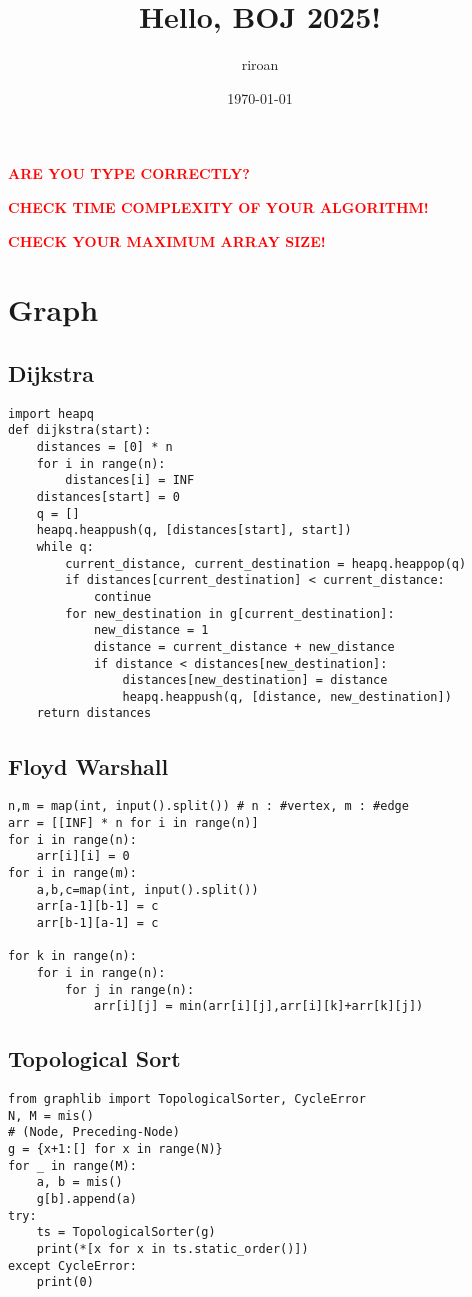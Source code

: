 \documentclass[landscape, 8pt, a4paper, oneside, twocolumn]{extarticle}
\title{Hello, BOJ 2025!}
\author{riroan}
\date{\today}
\begin{document}
	{

		\maketitle


		\tableofcontents
	}
	\thispagestyle{fancy}
	\pagebreak
\textcolor{red}{\textbf{ARE YOU TYPE CORRECTLY?}}

\textcolor{red}{\textbf{CHECK TIME COMPLEXITY OF YOUR ALGORITHM!}}

\textcolor{red}{\textbf{CHECK YOUR MAXIMUM ARRAY SIZE!}}
\section{Graph}
\subsection{Dijkstra}
\begin{verbatim}
import heapq
def dijkstra(start):
    distances = [0] * n
    for i in range(n):
        distances[i] = INF
    distances[start] = 0
    q = []
    heapq.heappush(q, [distances[start], start])
    while q:
        current_distance, current_destination = heapq.heappop(q)
        if distances[current_destination] < current_distance:
            continue
        for new_destination in g[current_destination]:
            new_distance = 1
            distance = current_distance + new_distance
            if distance < distances[new_destination]:
                distances[new_destination] = distance
                heapq.heappush(q, [distance, new_destination])
    return distances
	\end{verbatim}
	\subsection{Floyd Warshall}
\begin{verbatim}
n,m = map(int, input().split()) # n : #vertex, m : #edge
arr = [[INF] * n for i in range(n)]
for i in range(n):
    arr[i][i] = 0
for i in range(m):
    a,b,c=map(int, input().split())
    arr[a-1][b-1] = c
    arr[b-1][a-1] = c

for k in range(n):
    for i in range(n):
        for j in range(n):
            arr[i][j] = min(arr[i][j],arr[i][k]+arr[k][j])
\end{verbatim}
\subsection{Topological Sort}
\begin{verbatim}
from graphlib import TopologicalSorter, CycleError
N, M = mis()
# (Node, Preceding-Node)
g = {x+1:[] for x in range(N)}
for _ in range(M):
    a, b = mis()
    g[b].append(a)
try:
    ts = TopologicalSorter(g)
    print(*[x for x in ts.static_order()])
except CycleError:
    print(0)
\end{verbatim}
\end{document}
